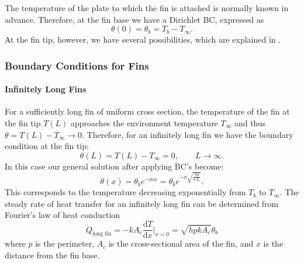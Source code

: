 The temperature of the plate to which the fin is attached is normally known in advance.
Therefore, at the fin base we have a Dirichlet BC, expressed as
\begin{equation*}
  \theta(0) = \theta_b = T_b - T_{\infty}
.\end{equation*}
At the fin tip, however, we have several possibilities, which are explained in .

\subsubsection{Boundary Conditions for Fins} \label{sec:bc}

\paragraph{Infinitely Long Fins}
For a sufficiently long fin of uniform cross section, the temperature of the fin at the fin tip $T(L)$ approaches the environment temperature $T_{\infty}$ and thus $\theta = T(L) - T_{\infty} \to 0$.
Therefore, for an infinitely long fin we have the boundary condition at the fin tip:
\begin{equation*}
  \theta(L) = T(L)- T_{\infty} = 0, \qquad L \to \infty
.\end{equation*}
In this case our general solution after applying BC's become:
\begin{equation*}
  \theta(x) = \theta_b e^{-m x} = \theta_b e^{-x \sqrt{\frac{h p}{k A_{c}}}}
.\end{equation*}
This corresponds to the temperature decreasing exponentially from $T_b$ to $T_{\infty}$.
The steady rate of heat transfer for an infinitely long fin can be determined from Fourier's law of heat conduction
\begin{equation*}
  \dot{Q}_{\text{long fin}} = - k A_{c} \frac{\mathrm{d}T}{\mathrm{d}x} \bigg|_{x = 0} = \sqrt{h p k A_c} \theta_b
\end{equation*}
where $p$ is the perimeter, $A_c$ is the cross-sectional area of the fin, and $x$ is the distance from the fin base.

